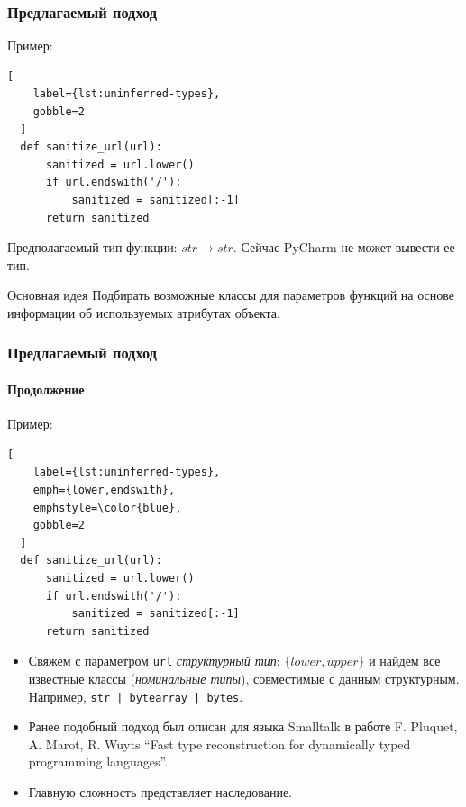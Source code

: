 \documentclass[handout]{beamer}
\begin{document}
\begin{frame}[fragile]
  \frametitle{Предлагаемый подход}
  
  Пример:
  \begin{lstlisting}[
    label={lst:uninferred-types},
    gobble=2
  ]
  def sanitize_url(url):
      sanitized = url.lower()
      if url.endswith('/'):
          sanitized = sanitized[:-1]
      return sanitized
  \end{lstlisting}
  
 Предполагаемый тип функции: $str \rightarrow str$. Сейчас PyCharm не может
 вывести ее тип.

 \begin{block}{Основная идея}
   Подбирать возможные классы для параметров функций на основе информации об
   используемых атрибутах объекта. 
 \end{block}
    
\end{frame}

\begin{frame}[fragile]
  \frametitle{Предлагаемый подход}
  \framesubtitle{Продолжение}
  
  Пример:
  \begin{lstlisting}[
    label={lst:uninferred-types},
    emph={lower,endswith},
    emphstyle=\color{blue},
    gobble=2
  ]
  def sanitize_url(url):
      sanitized = url.lower()
      if url.endswith('/'):
          sanitized = sanitized[:-1]
      return sanitized
  \end{lstlisting}

  \begin{itemize}
      \item Свяжем с параметром  \texttt{url} \emph{структурный тип}: $\{ lower,
        upper \}$ и найдем все известные классы (\emph{номинальные типы}),
        совместимые с данным структурным. Например, \texttt{str | bytearray | bytes}.

      \item Ранее подобный подход был описан для языка Smalltalk в работе F.
        Pluquet, A.  Marot, R. Wuyts ``Fast type reconstruction for dynamically
        typed programming languages''.

      \item Главную сложность представляет наследование.
  \end{itemize}
  


\end{frame}
\end{document}
